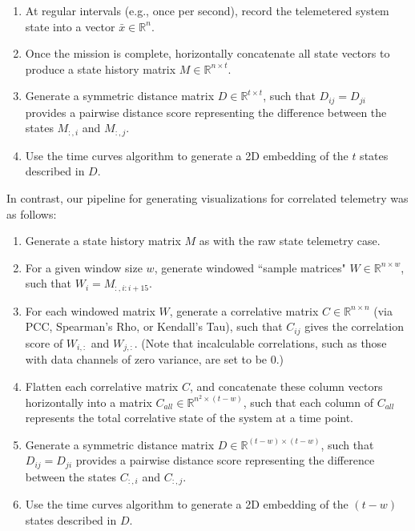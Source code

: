 \begin{enumerate}
    \item At regular intervals (e.g., once per second), record the telemetered system state into a vector $\bar{x} \in \mathbb{R}^{n}$.
    \item Once the mission is complete, horizontally concatenate all state vectors to produce a state history matrix $M \in \mathbb{R}^{n \times t}$.
    \item Generate a symmetric distance matrix $D \in \mathbb{R}^{t \times t}$, such that $D_{ij} = D_{ji}$ provides a pairwise distance score representing the difference between the states $M_{:,i}$ and $M_{:,j}$.
    \item Use the time curves algorithm to generate a 2D embedding of the $t$ states described in $D$.
\end{enumerate}

In contrast, our pipeline for generating visualizations for correlated telemetry was as follows:

\begin{enumerate}
    \item Generate a state history matrix $M$ as with the raw state telemetry case.
    \item For a given window size $w$, generate windowed ``sample matrices" $W \in \mathbb{R}^{n \times w}$, such that $W_{i} = M_{:, i:i+15}$.
    \item For each windowed matrix $W$, generate a correlative matrix $C \in \mathbb{R}^{n \times n}$ (via PCC, Spearman's Rho, or Kendall's Tau), such that $C_{ij}$ gives the correlation score of $W_{i,:}$ and $W_{j,:}$. (Note that incalculable correlations, such as those with data channels of zero variance, are set to be 0.)
    \item Flatten each correlative matrix $C$, and concatenate these column vectors horizontally into a matrix $C_{all} \in \mathbb{R}^{n^{2} \times (t - w)}$, such that each column of $C_{all}$ represents the total correlative state of the system at a time point.
    \item Generate a symmetric distance matrix $D \in \mathbb{R}^{(t - w) \times (t - w)}$, such that $D_{ij} = D_{ji}$ provides a pairwise distance score representing the difference between the states $C_{:,i}$ and $C_{:,j}$.
    \item Use the time curves algorithm to generate a 2D embedding of the $(t - w)$ states described in $D$.
\end{enumerate}

